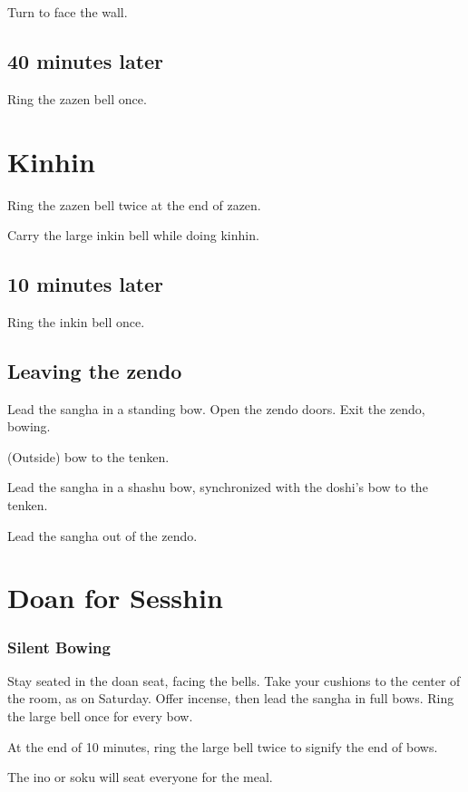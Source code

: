 \documentclass{chantbook}
\begin{document}
\begin{services}
Turn to face the wall.

\section*{40 minutes later}

\doan Ring the zazen bell once. \bigspace\zazenbell

\chapter{Kinhin}
\doan Ring the zazen bell twice at the end of zazen.
\kinhinBells

Carry the large inkin bell while doing kinhin.

\section*{10 minutes later}

\doan Ring the inkin bell once. \bigspace\zazenbell

\section*{Leaving the zendo}
\doshi Lead the sangha in a standing bow.
\tenken Open the zendo doors.
\doshi Exit the zendo, bowing.

(Outside) bow to the tenken.

\doan Lead the sangha in a shashu bow, synchronized with the doshi's bow to the
tenken.

Lead the sangha out of the zendo.

\chapter{Doan for Sesshin}
\subsection*{Silent Bowing}
\doan Stay seated in the doan seat, facing the bells.
\sangha Take your cushions to the center of the room, as on Saturday.
\doshi Offer incense, then lead the sangha in full bows.
\doan Ring the large bell once for every bow. \bigspace\largebell

At the end of 10 minutes, ring the large bell twice to signify the end of bows.

\bline{\hfill\largebell\hfill\largebell\hfill\null}

The ino or soku will seat everyone for the meal.


\end{services}
\end{document}
